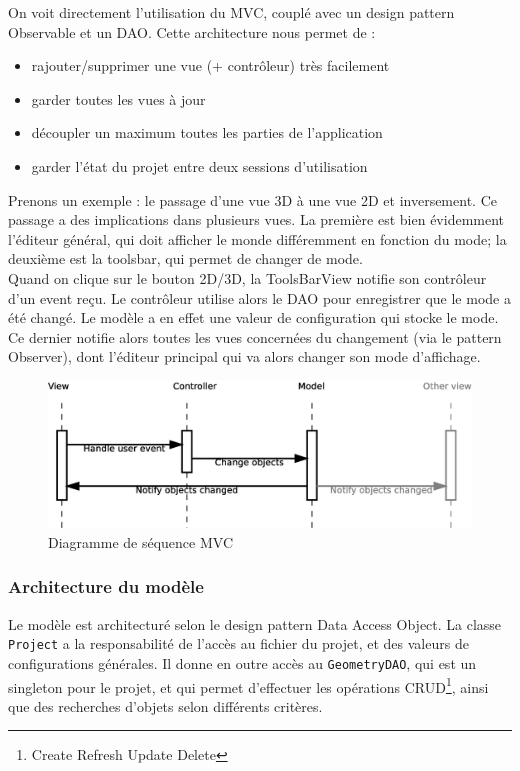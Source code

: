	On voit directement l'utilisation du MVC, couplé avec un design pattern
	Observable et un DAO. Cette architecture nous permet de :
	\begin{itemize}
		\item rajouter/supprimer une vue (+ contrôleur) très facilement
		\item garder toutes les vues à jour
		\item découpler un maximum toutes les parties de l'application
		\item garder l'état du projet entre deux sessions d'utilisation
	\end{itemize}

	Prenons un exemple : le passage d'une vue 3D à une vue 2D et inversement.
	Ce passage a des implications dans plusieurs vues. La première est
	bien évidemment l'éditeur général, qui doit afficher le monde différemment
	en fonction du mode; la deuxième est la toolsbar, qui permet de changer de
	mode.\\

	Quand on clique sur le bouton 2D/3D, la ToolsBarView notifie son contrôleur
	d'un event reçu. Le contrôleur utilise alors le DAO pour enregistrer que
	le mode a été changé. Le modèle a en effet une valeur de configuration qui
	stocke le mode. Ce dernier notifie alors toutes les vues concernées du 
	changement (via le pattern Observer), dont l'éditeur principal qui va alors
	changer son mode d'affichage.\\

	\begin{figure}
		\includegraphics[width=\textwidth]{uml/MVC-sequence.eps}
		\caption{\label{fig:mvc:sequence} Diagramme de séquence MVC}
	\end{figure}

	\subsubsection{Architecture du modèle}
	Le modèle est architecturé selon le design pattern Data Access Object.
	La classe \texttt{Project} a la responsabilité de l'accès au fichier du
	projet, et des valeurs de configurations générales. Il donne en outre accès
	au \texttt{GeometryDAO}, qui est un singleton pour le projet, et qui permet
	d'effectuer les opérations CRUD\footnote{Create Refresh Update Delete},
	ainsi que des recherches d'objets selon différents critères.

